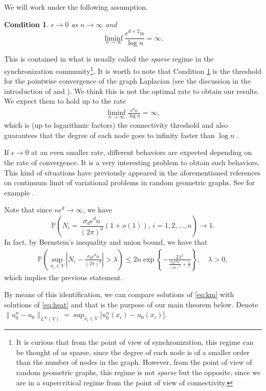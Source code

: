 \documentclass[a4paper,11pt]{amsart}
\newtheorem{condition}[theorem]{Condition}
\renewcommand{\P}{\mathbb{P}}
\newcommand{\ep}{\epsilon}
\numberwithin{equation}{section}
\numberwithin{theorem}{section}
\theoremstyle{definition}
\begin{document}
We will work under the following assumption.
\begin{condition}\label{assump-eps}
$\ep\to0$ as $n\to\infty$ and 
\[
\liminf_{n\to\infty}\frac{\ep^{d+2}n}{\log n}=\infty.
\]
\end{condition}
This is contained in what is usually called the {\em sparse} regime in the synchronization community\footnote{It is curious that from the point of view of synchronization, this regime can be thought of as sparse, since the degree of each node is of a smaller order than the number of nodes in the graph. However, from the point of view of random geometric graphs, this regime is not {\em sparse} but the opposite, since we are in a supercritical regime from the point of view of connectivity.}.  It is worth to note that Condition \ref{assump-eps} is the threshold for the pointwise convergence of the graph Laplacian (see the discussion in the introduction of \cite{trillos2020error} and \cite[Section 2.2]{armstrong2023quantitative}). We think this is not the optimal rate to obtain our results. We expect them to hold up to the rate
\begin{align*}%
\liminf_{n\to\infty}\frac{\ep^{d}n}{\log n}=\infty,
\end{align*}
which is (up to logarithmic factors) the connectivity threshold and also guarantees that the degree of each node goes to infinity faster than $\log n$ \cite{penrose1995single}.

If $\ep \to 0$ at an even smaller rate, different behaviors are expected depending on the rate of convergence. It is a very interesting problem to obtain such behaviors. This kind of situations have previously appeared in the aforementioned references on continuum limit of variational problems in random geometric graphs. See for example \cite{trillos2020error}.


Note that since $n\epsilon^d \to \infty$, we have
\[
\P\left(N_i=\frac{\sigma_d\ep^dn}{(2\pi)^d}\left(1+o(1)\right),\,  i=1,2,...,n\right)\to 1.
\]
In fact, by Bernstein's inequality and union bound, we have that 
\begin{align}\label{bernstein}
\P\left(\sup_{x_i\in V}\left|N_i-\frac{\sigma_d\ep^dn}{(2\pi)^d}\right|>\lambda\right)\le 2n \exp\left\{-\frac{2\lambda^2}{\frac{\sigma_d \ep^d n}{(2\pi)^d}+\frac{\lambda}{3}}\right\},\quad \lambda>0,
\end{align}
which implies the previous statement.

By means of this identification, we can compare solutions of \eqref{eq:km} with solutions of \eqref{eq:heat} and that is the purpose of our main theorem below. Denote $\|u^n_0 - u_0\|_{L^\infty(V)} = \sup_{x_i\in V}|u^n_0(x_i) - u_0(x_i)|$.
\end{document}
